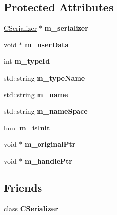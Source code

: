 \subsection*{Protected Attributes}
\begin{DoxyCompactItemize}
\item 
\mbox{\label{class_c_serialized_value_a0871a4a6bdd01aebe227fda42a1b5e66}} 
\hyperlink{class_c_serializer}{C\+Serializer} $\ast$ {\bfseries m\+\_\+serializer}
\item 
\mbox{\label{class_c_serialized_value_a0145fbc20178a9c722709a3e40618c6e}} 
void $\ast$ {\bfseries m\+\_\+user\+Data}
\item 
\mbox{\label{class_c_serialized_value_a090e1c565f821d3b4eeb6a418eb0a97f}} 
int {\bfseries m\+\_\+type\+Id}
\item 
\mbox{\label{class_c_serialized_value_a4db1d1aae7118e8a70404d1a07523a6e}} 
std\+::string {\bfseries m\+\_\+type\+Name}
\item 
\mbox{\label{class_c_serialized_value_a9e8c24673d33d1a994b0c460bca4e1f6}} 
std\+::string {\bfseries m\+\_\+name}
\item 
\mbox{\label{class_c_serialized_value_a51aa9f2503513cbb146af247234bd835}} 
std\+::string {\bfseries m\+\_\+name\+Space}
\item 
\mbox{\label{class_c_serialized_value_afab6067d2a24f2248780e46a9dce0012}} 
bool {\bfseries m\+\_\+is\+Init}
\item 
\mbox{\label{class_c_serialized_value_ad39435527a66e13c5038e6210b36c1a1}} 
void $\ast$ {\bfseries m\+\_\+original\+Ptr}
\item 
\mbox{\label{class_c_serialized_value_a8fa6ba0c3a7c8555240b25a50f82ef59}} 
void $\ast$ {\bfseries m\+\_\+handle\+Ptr}
\end{DoxyCompactItemize}
\subsection*{Friends}
\begin{DoxyCompactItemize}
\item 
\mbox{\label{class_c_serialized_value_a4d820ccd071659b3ddc0e01636efdeff}} 
class {\bfseries C\+Serializer}
\end{DoxyCompactItemize}


